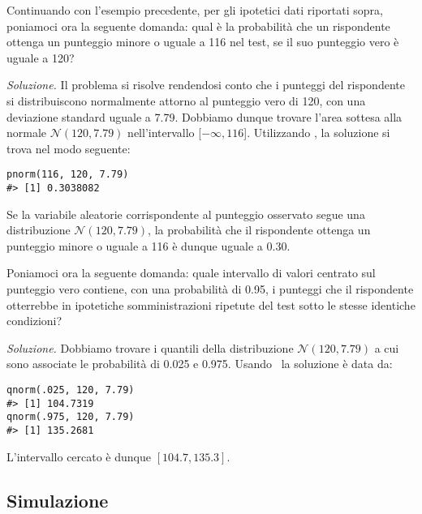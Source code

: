 \begin{exmp}

Continuando con l'esempio precedente, per gli ipotetici dati riportati sopra, poniamoci ora la seguente domanda: qual è la probabilità che un rispondente ottenga un punteggio minore o uguale a 116 nel test, se il suo punteggio vero è uguale a 120?

\medskip

\emph{Soluzione.}
Il problema si risolve rendendosi conto che i punteggi del rispondente si distribuiscono normalmente attorno al punteggio vero di 120, con una deviazione standard uguale a 7.79. Dobbiamo dunque trovare l'area sottesa alla normale $\mathcal{N}(120, 7.79)$
nell'intervallo [$-\infty, 116$]. Utilizzando  \R, la soluzione si trova nel modo seguente:
\begin{lstlisting} 
pnorm(116, 120, 7.79)
#> [1] 0.3038082
\end{lstlisting}
Se la variabile aleatorie corrispondente al punteggio osservato segue una distribuzione $\mathcal{N}(120, 7.79)$, la probabilità che il rispondente ottenga un punteggio minore o uguale a 116 è dunque uguale a 0.30.  
\end{exmp}


\begin{exmp}
Poniamoci ora la seguente domanda: quale intervallo di valori centrato sul punteggio vero contiene, con una probabilità di 0.95, i punteggi che il rispondente otterrebbe in ipotetiche somministrazioni ripetute del test sotto le stesse identiche condizioni?

\medskip

\emph{Soluzione.}
Dobbiamo trovare i quantili della distribuzione $\mathcal{N}(120, 7.79)$ a cui sono associate le probabilità di 0.025 e 0.975. Usando \R\, la soluzione è data da:
\begin{lstlisting} 
qnorm(.025, 120, 7.79)
#> [1] 104.7319
qnorm(.975, 120, 7.79)
#> [1] 135.2681
\end{lstlisting}
L'intervallo cercato è dunque $[104.7, 135.3]$. 
\end{exmp}


\subsection{Simulazione}

